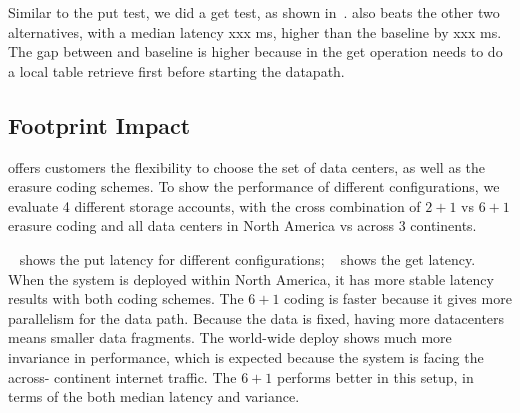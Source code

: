 Similar to the put test, we did a \name get test, as shown in~. 
\name also beats the other two alternatives, with a median latency xxx ms, higher than 
the baseline by xxx ms. The gap between \name and baseline is higher because in the get 
operation \name needs to do a local table retrieve first before starting the datapath. 






\subsection{Footprint Impact}

\name offers customers the flexibility to choose the set of data centers, as well as the 
erasure coding schemes. To show the performance of different configurations, we evaluate 
4 different \name storage accounts, with the cross combination of $2+1$ vs $6+1$ erasure 
coding and all data centers in North America vs across 3 continents.

~ shows the put latency for different configurations; 
~ shows the get latency. When the system is deployed within 
North America, it has more stable latency results with both coding schemes. The $6+1$ coding
is faster because it gives more parallelism for the data path. Because the data is fixed, 
having more datacenters means smaller data fragments. The world-wide deploy shows much 
more invariance in performance, which is expected because the system is facing the across-
continent internet traffic. The $6+1$ performs better in this setup, in terms of the 
both median latency and variance. 


